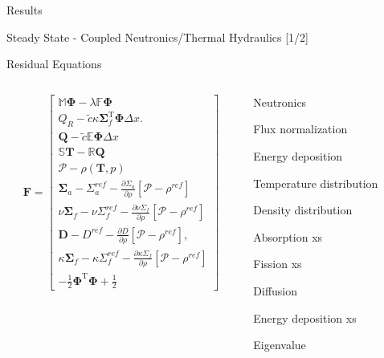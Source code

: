 \documentclass{beamer}
\begin{document}
\begin{section}{Results}
\begin{frame}{Steady State - Coupled Neutronics/Thermal Hydraulics [1/2]}
\begin{block}{Residual Equations}
\begin{center}
\begin{columns}
      \begin{column}{0.5\textwidth}
	\[
	    \mathbf{F}=\left[\begin{array}{c}
	    \mathbb{M}\mathbf{\Phi}-\lambda\mathbb{F}\mathbf{\Phi}\\
	    Q_{R}-\tilde{c}\kappa\mathbf{\Sigma}_{f}^{\mathrm{T}}\mathbf{\Phi}\Delta x.\\
	    \mathbf{Q}-\tilde{c}\mathbb{E}\mathbf{\Phi}\Delta x\\
	    \mathbb{S}\mathbf{T}-\mathbb{R}\mathbf{Q}\\
	    \mathcal{P}-\rho\left(\mathbf{T},p\right)\\
	    \mathbf{\Sigma}_{a}-\Sigma_{a}^{ref}-\frac{\partial\Sigma_{a}}{\partial\rho}\left[\mathcal{P}-\rho^{ref}\right]\\
	    \nu\mathbf{\Sigma}_{f}-\nu\Sigma_{f}^{ref}-\frac{\partial\nu\Sigma_{f}}{\partial\rho}\left[\mathcal{P}-\rho^{ref}\right]\\
	    \mathbf{D}-D^{ref}-\frac{\partial D}{\partial\rho}\left[\mathcal{P}-\rho^{ref}\right],\\
	    \kappa\mathbf{\Sigma}_{f}-\kappa\Sigma_{f}^{ref}-\frac{\partial\kappa\Sigma_{f}}{\partial\rho}\left[\mathcal{P}-\rho^{ref}\right]\\
	    -\frac{1}{2}\mathbf{\Phi}^{\mathrm{T}}\mathbf{\Phi}+\frac{1}{2}
	    \end{array}\right]
	\]
      \end{column}
      \begin{column}{0.4\textwidth}
	\begin{customlist}{2ex}{0pt}
	  \item Neutronics
	  \item Flux normalization
	  \item Energy deposition
	  \item Temperature distribution
	  \item Density distribution
	  \item Absorption xs
	  \item Fission xs
	  \item Diffusion 
	  \item Energy deposition xs
	  \item Eigenvalue
	\end{customlist}
      \end{column}
    \end{columns}
    \end{center}
  \end{block}
  \begin{customlist}{2ex}{0pt}

\end{customlist}
\end{frame}
\end{section}
\end{document}
